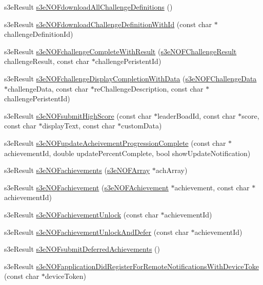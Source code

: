 \begin{DoxyCompactItemize}
\item 
s3eResult \hyperlink{group___n_open_feint_api_group_ga3b6050107c6b8a85bbc40a99efdc0bbb}{s3eNOFdownloadAllChallengeDefinitions} ()
\item 
s3eResult \hyperlink{group___n_open_feint_api_group_gabf380208ac3cbb38d7b2a6e097ccaac5}{s3eNOFdownloadChallengeDefinitionWithId} (const char $\ast$challengeDefinitionId)
\item 
s3eResult \hyperlink{group___n_open_feint_api_group_gac0bbac15d2f5955c47e4b1c97de9041d}{s3eNOFchallengeCompleteWithResult} (\hyperlink{group___n_open_feint_api_group_ga954444cdbeafa2947e969f78ed1e29f4}{s3eNOFChallengeResult} challengeResult, const char $\ast$challengePeristentId)
\item 
s3eResult \hyperlink{group___n_open_feint_api_group_ga5d1d6b1cc48e419f5b2c70008ebb7a27}{s3eNOFchallengeDisplayCompletionWithData} (\hyperlink{structs3e_n_o_f_challenge_data}{s3eNOFChallengeData} $\ast$challengeData, const char $\ast$reChallengeDescription, const char $\ast$challengePeristentId)
\item 
s3eResult \hyperlink{group___n_open_feint_api_group_gab867b2aef6d359907508f9db15dc46b1}{s3eNOFsubmitHighScore} (const char $\ast$leaderBoadId, const char $\ast$score, const char $\ast$displayText, const char $\ast$customData)
\item 
s3eResult \hyperlink{group___n_open_feint_api_group_ga08d7542b314ea594515cffa2dd86374d}{s3eNOFupdateAcheivementProgressionComplete} (const char $\ast$achievementId, double updatePercentComplete, bool showUpdateNotification)
\item 
s3eResult \hyperlink{group___n_open_feint_api_group_ga00f8721dad47b69383090091a37ed97e}{s3eNOFachievements} (\hyperlink{structs3e_n_o_f_array}{s3eNOFArray} $\ast$achArray)
\item 
s3eResult \hyperlink{group___n_open_feint_api_group_ga020ea6704c5e2c7449bae9fd13bb7b43}{s3eNOFachievement} (\hyperlink{structs3e_n_o_f_achievement}{s3eNOFAchievement} $\ast$achievement, const char $\ast$achievementId)
\item 
s3eResult \hyperlink{group___n_open_feint_api_group_ga007858ccc16ba9fddaa18af73d68f399}{s3eNOFachievementUnlock} (const char $\ast$achievementId)
\item 
s3eResult \hyperlink{group___n_open_feint_api_group_ga58e6c378a40420b5dd124a518571d477}{s3eNOFachievementUnlockAndDefer} (const char $\ast$achievementId)
\item 
s3eResult \hyperlink{group___n_open_feint_api_group_ga4186be6c56b04643cb06fcc09f1fede6}{s3eNOFsubmitDeferredAchievements} ()
\item 
s3eResult \hyperlink{group___n_open_feint_api_group_gaf34d456ca65c4496ff0aca60484a5e50}{s3eNOFapplicationDidRegisterForRemoteNotificationsWithDeviceToke} (const char $\ast$deviceToken)
\end{DoxyCompactItemize}

